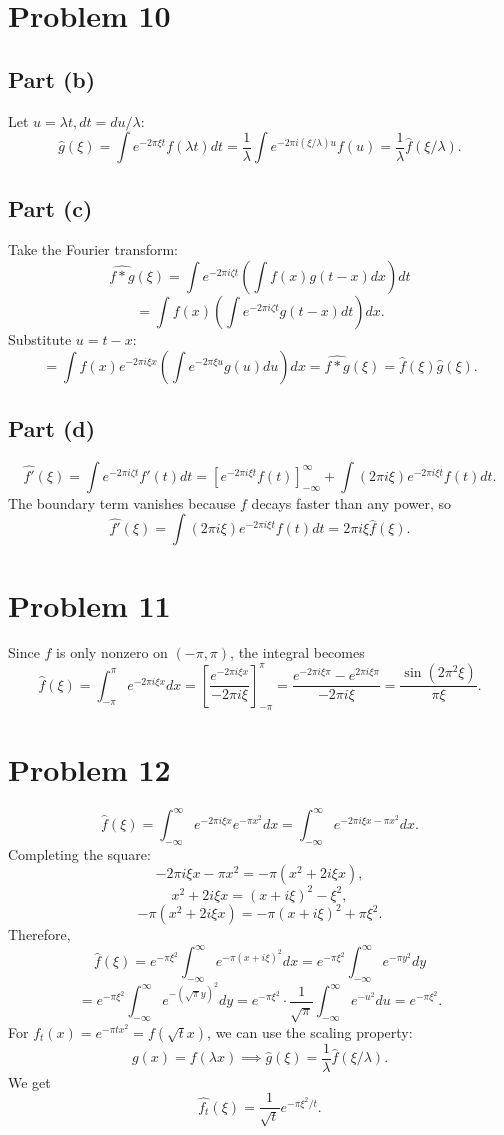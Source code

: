 \documentclass{article}
\newcommand{\bigp}[1]{\left(#1\right)}
\newcommand{\bigb}[1]{\left[#1\right]}
\begin{document}
\section*{Problem 10}
\subsection*{Part (b)}
Let $u = \lambda t, dt = du/\lambda$:
$$\widehat{g}(\xi) = \int e^{-2\pi\xi t}f(\lambda t)dt = \frac{1}{\lambda}\int e^{-2\pi i(\xi/\lambda)u}f(u) = \frac{1}{\lambda}\widehat{f}(\xi/\lambda).$$

\subsection*{Part (c)}
Take the Fourier transform:
$$\widehat{f * g}(\xi) = \int e^{-2\pi i\zeta t}\bigp{\int f(x)g(t - x)dx}dt$$
$$= \int f(x)\bigp{\int e^{-2\pi i\zeta t}g(t - x)dt}dx.$$
Substitute $u = t - x$:
$$= \int f(x)e^{-2\pi i\xi x}\bigp{\int e^{-2\pi\xi u}g(u)du}dx = \widehat{f * g}(\xi) = \widehat{f}(\xi)\widehat{g}(\xi).$$

\subsection*{Part (d)}
$$\widehat{f'}(\xi) = \int e^{-2\pi i\zeta t}f'(t)dt = \bigb{e^{-2\pi i\xi t}f(t)}_{-\infty}^\infty + \int (2\pi i\xi)e^{-2\pi i\xi t}f(t) dt.$$
The boundary term vanishes because $f$ decays faster than any power, so
$$\widehat{f'}(\xi) = \int (2\pi i\xi)e^{-2\pi i\xi t}f(t) dt = 2\pi i\xi \widehat{f}(\xi).$$

\section*{Problem 11}
Since $f$ is only nonzero on $(-\pi, \pi)$, the integral becomes
$$\widehat{f}(\xi) = \int_{-\pi}^\pi e^{-2\pi i\xi x}dx = \bigb{\frac{e^{-2\pi i\xi x}}{-2\pi i\xi}}_{-\pi}^\pi = \frac{e^{-2\pi i\xi\pi} - e^{2\pi i\xi\pi}}{-2\pi i\xi} = \frac{\sin(2\pi^2\xi)}{\pi\xi}.$$

\section*{Problem 12}
$$\widehat{f}(\xi) = \int_{-\infty}^\infty e^{-2\pi i\xi x}e^{-\pi x^2}dx = \int_{-\infty}^\infty e^{-2\pi i\xi x -\pi x^2}dx.$$
Completing the square:
$$-2\pi i\xi x -\pi x^2 = -\pi(x^2 + 2i\xi x),$$
$$x^2 + 2i\xi x = (x + i\xi)^2 - \xi^2,$$
$$-\pi(x^2 + 2i\xi x) = -\pi(x + i\xi)^2 + \pi\xi^2.$$
Therefore,
$$\widehat{f}(\xi) = e^{-\pi\xi^2}\int_{-\infty}^\infty e^{-\pi(x + i\xi)^2}dx = e^{-\pi\xi^2}\int_{-\infty}^\infty e^{-\pi y^2}dy$$
$$= e^{-\pi\xi^2}\int_{-\infty}^\infty e^{-(\sqrt\pi y)^2}dy = e^{-\pi\xi^2}\cdot \frac{1}{\sqrt{\pi}}\int_{-\infty}^\infty e^{-u^2}du = e^{-\pi\xi^2}.$$
For $f_t(x) = e^{-\pi tx^2} = f(\sqrt{t}x)$, we can use the scaling property:
$$g(x) = f(\lambda x) \implies \widehat{g}(\xi) = \frac{1}{\lambda}\widehat{f}(\xi/\lambda).$$
We get
$$\widehat{f_t}(\xi) = \frac{1}{\sqrt{t}}e^{-\pi\xi^2/t}.$$
\end{document}
